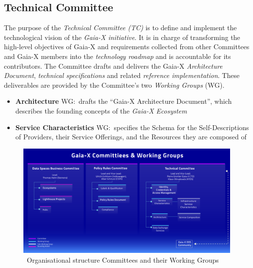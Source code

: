 \subsection{Technical Committee}\label{subsec:technical-committee}

The purpose of the \textit{Technical Committee (TC)} is to define and implement the technological vision of the \textit{Gaia-X initiative}.
It is in charge of transforming the high-level objectives of Gaia-X and requirements collected from other Committees and Gaia-X members into the \textit{technology roadmap} and is accountable for its contributors.
The Committee drafts and delivers the Gaia-X \textit{Architecture Document}, \textit{technical specifications} and related \textit{reference implementation}.
These deliverables are provided by the Committee's two \textit{Working Groups} (WG).~\cite{gaiax}
\begin{itemize}
    \item \textbf{Architecture} WG:~drafts the ``Gaia-X Architecture Document'', which describes the founding concepts of the \textit{Gaia-X Ecosystem}
    \item \textbf{Service Characteristics} WG:~specifies the Schema for the Self-Descriptions of Providers, their Service Offerings, and the Resources they are composed of
\end{itemize}

\begin{figure}
    \centering
    \includegraphics[width=\textwidth]{assets/committees-and-working-groups}
    \caption{~Organisational structure Committees and their Working Groups~\cite{gaiax}}\label{fig:organisational-committees-structure}
\end{figure}

